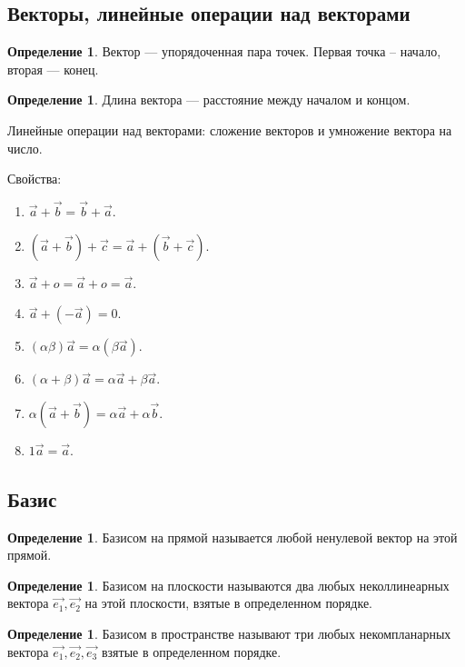 \documentclass[12pt]{report}
\theoremstyle{definition}
\newtheorem{definition}[theorem]{Определение}
\begin{document}
\subsection{Векторы, линейные операции над векторами}
\begin{definition}
Вектор --- упорядоченная пара точек.
Первая точка -- начало, вторая --- конец.
\end{definition}

\begin{definition}
Длина вектора --- расстояние между началом и концом.
\end{definition}

Линейные операции над векторами: сложение векторов и
умножение вектора на число.

Свойства:
\begin{enumerate}
\item $\vec{a} + \vec{b} = \vec{b} + \vec{a}$.
\item $(\vec{a} + \vec{b}) + \vec{c} = \vec{a} + (\vec{b} + \vec{c})$.
\item $\vec{a} + o = \vec{a} + o = \vec{a}$.
\item $\vec{a} + (-\vec{a}) = 0$.
\item $(\alpha \beta) \vec{a} = \alpha (\beta \vec{a})$.
\item $(\alpha + \beta) \vec{a} = \alpha \vec{a}  + \beta \vec{a}$.
\item $ \alpha (\vec{a} + \vec{b}) = \alpha \vec{a} + \alpha \vec{b}$.
\item $ 1  \vec{a} = \vec{a}$.
\end{enumerate}

\subsection{Базис}
\begin{definition}
Базисом на прямой называется любой ненулевой вектор на этой прямой.
\end{definition}

\begin{definition}
Базисом на плоскости называются два любых неколлинеарных вектора $\vec{e_1}, \vec{e_2}$
на этой плоскости, взятые в определенном порядке.
\end{definition}

\begin{definition}
Базисом в пространстве называют три любых некомпланарных вектора
$\vec{e_1}, \vec{e_2}, \vec{e_3}$ взятые в определенном порядке.
\end{definition}
\end{document}
